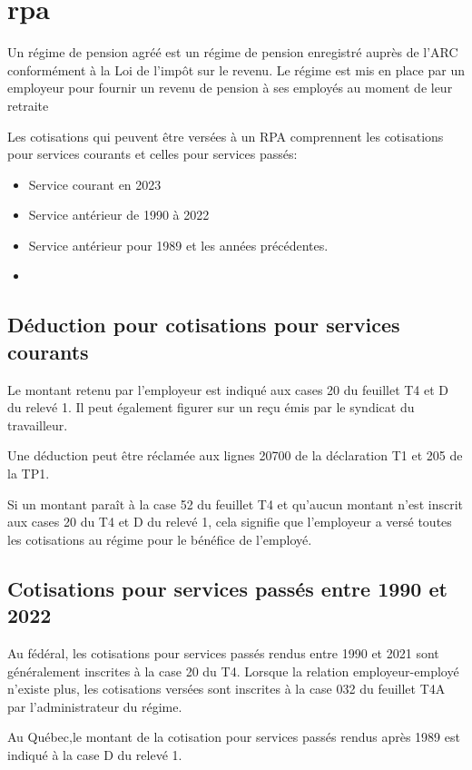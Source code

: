 \section{\acrfull{rpa}}
\begin{intro}
	Un régime de pension agréé est un régime de pension enregistré auprès de l'ARC conformément à la Loi de l'impôt sur le revenu. Le régime est mis en place par un employeur pour fournir un revenu de pension à ses employés au moment de leur retraite
\end{intro}
Les cotisations qui peuvent être versées à un RPA comprennent les cotisations pour services courants et celles pour services passés:
\begin{itemize}
	\item Service courant en 2023
	\item Service antérieur de 1990 à 2022
	\item Service antérieur pour 1989 et les années précédentes.
	\item 
\end{itemize}


\subsection{Déduction pour cotisations pour services courants}
Le montant retenu par l'employeur est indiqué aux cases 20 du feuillet T4 et D du relevé 1. Il peut également figurer sur un reçu émis par le syndicat du travailleur.

Une déduction peut être réclamée aux lignes 20700 de la déclaration T1 et 205 de la TP1.

Si un montant paraît à la case 52 du feuillet T4 et qu'aucun montant n'est inscrit aux cases 20 du T4 et D du relevé 1, cela signifie que l'employeur a versé toutes les cotisations au régime pour le bénéfice de l'employé.


\subsection{Cotisations pour services passés entre 1990 et 2022}
Au fédéral, les cotisations pour services passés rendus entre 1990 et 2021 sont généralement inscrites à la case 20 du T4. Lorsque la relation employeur-employé n'existe plus, les cotisations versées sont inscrites à la case 032 du feuillet T4A par l'administrateur du régime.

Au Québec,le montant de la cotisation pour services passés rendus après 1989 est indiqué à la case D du relevé 1.

